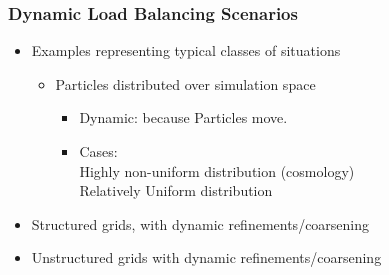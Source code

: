 \begin{frame}[fragile]
\frametitle{Dynamic Load Balancing Scenarios}
\begin{itemize}
 \item Examples representing typical classes of situations
 \begin{itemize}
  \item Particles distributed over simulation space
  \begin{itemize}
   \item Dynamic: because Particles move.
   \item Cases:\\
   Highly non-uniform distribution (cosmology)\\
   Relatively Uniform distribution 
  \end{itemize}
 \end{itemize}
\item Structured grids, with dynamic refinements/coarsening
\item Unstructured grids with dynamic refinements/coarsening
\end{itemize}
\end{frame}

